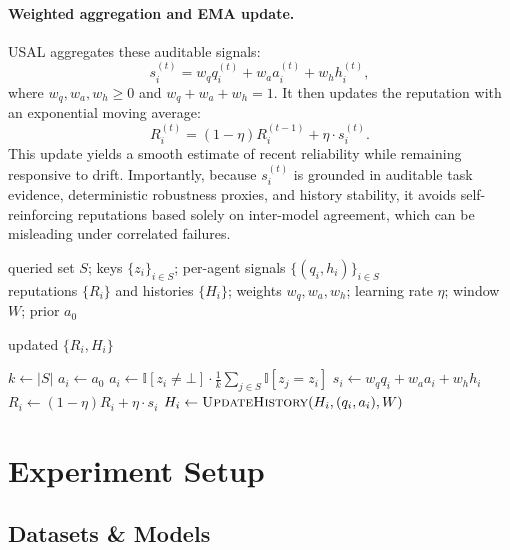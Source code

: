 \documentclass[acmsmall,screen,review,anonymous]{acmart}
\begin{document}
\paragraph{Weighted aggregation and EMA update.}
USAL aggregates these auditable signals:
\begin{equation}
s_i^{(t)} = w_q q_i^{(t)} + w_a a_i^{(t)} + w_h h_i^{(t)},
\label{eq:usal_score}
\end{equation}
where $w_q,w_a,w_h\ge0$ and $w_q+w_a+w_h=1$.
It then updates the reputation with an exponential moving average:
\begin{equation}
R_i^{(t)} = (1-\eta)R_i^{(t-1)} + \eta \cdot s_i^{(t)}.
\label{eq:ema}
\end{equation}
This update yields a smooth estimate of recent reliability while remaining responsive to drift.
Importantly, because $s_i^{(t)}$ is grounded in auditable task evidence, deterministic robustness proxies, and history stability, it avoids self-reinforcing reputations based solely on inter-model agreement, which can be misleading under correlated failures.
\begin{algorithm}[H]
\caption{USAL: online reputation update from auditable signals}
\label{alg:usal}
\begin{algorithmic}[1]
\Require \parbox[t]{0.93\linewidth}{
queried set $S$; keys $\{z_i\}_{i\in S}$; per-agent signals $\{(q_i,h_i)\}_{i\in S}$\\
reputations $\{R_i\}$ and histories $\{H_i\}$; weights $w_q,w_a,w_h$; learning rate $\eta$; window $W$; prior $a_0$
}
\Ensure updated $\{R_i,H_i\}$

\State $k \gets |S|$
        \State $a_i \gets a_0$
    \Else
        \State $a_i \gets \mathbb{I}[z_i\neq\bot]\cdot \frac{1}{k}\sum_{j\in S}\mathbb{I}[z_j=z_i]$
    \EndIf
    \State $s_i \gets w_q q_i + w_a a_i + w_h h_i$
    \State $R_i \gets (1-\eta)R_i + \eta\cdot s_i$
    \State $H_i \gets \Call{UpdateHistory}{H_i,(q_i,a_i),W}$
\EndFor
\State \Return
\end{algorithmic}
\end{algorithm}
\section{Experiment Setup}
\label{sec:exp_setup}

\subsection{Datasets \& Models}
\label{sec:exp_data_models}
\end{document}
